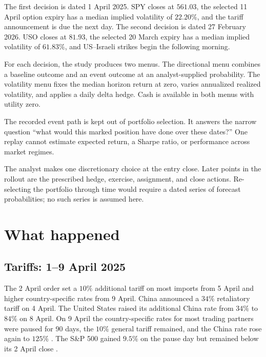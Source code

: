 \documentclass{strategynet-journal}
\begin{document}
\begin{SNcolumns}

The first decision is dated 1 April 2025.  SPY closes at \(561.03\), the
selected 11 April option expiry has a median implied volatility of \(22.20\%\),
and the tariff announcement is due the next day.  The second decision is dated
27 February 2026.  USO closes at \(81.93\), the selected 20 March expiry has a
median implied volatility of \(61.83\%\), and US--Israeli strikes begin the
following morning.

For each decision, the study produces two menus.  The directional menu
combines a baseline outcome and an event outcome at an analyst-supplied
probability.  The volatility menu fixes the median horizon return at zero,
varies annualized realized volatility, and applies a daily delta hedge.  Cash
is available in both menus with utility zero.

The recorded event path is kept out of portfolio selection.  It answers the
narrow question ``what would this marked position have done over these
dates?''  One replay cannot estimate expected return, a Sharpe ratio, or
performance across market regimes.

The analyst makes one discretionary choice at the entry close.  Later points
in the rollout are the prescribed hedge, exercise, assignment, and close
actions.  Re-selecting the portfolio through time would require a dated
series of forecast probabilities; no such series is assumed here.

\end{SNcolumns}

\section{What happened}

\subsection{Tariffs: 1--9 April 2025}

The 2 April order set a \(10\%\) additional tariff on most imports from
5 April and higher country-specific rates from 9 April.  China announced a
\(34\%\) retaliatory tariff on 4 April.  The United States raised its
additional China rate from \(34\%\) to \(84\%\) on 8 April.  On 9 April the
country-specific rates for most trading partners were paused for 90 days,
the \(10\%\) general tariff remained, and the China rate rose again to
\(125\%\) \cite{crs-tariffs}.  The S\&P 500 gained \(9.5\%\) on the pause day
but remained below its 2 April close \cite{strategynet-tariffs}.
\end{document}
